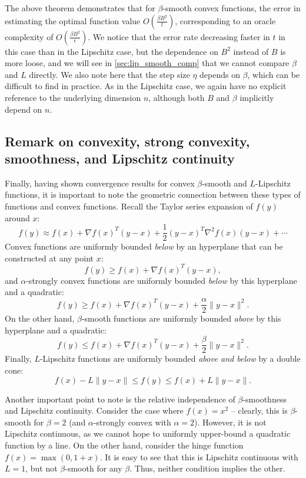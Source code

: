 The above theorem demonstrates that for $\beta$-smooth convex functions, the error in estimating the optimal function value $O\left(\frac{\beta B^2}{t}\right)$, corresponding to an oracle complexity of $O\left(\frac{\beta B^2}{\epsilon}\right)$. We notice that the error rate decreasing faster in $t$ in this case than in the Lipschitz case, but the dependence on $B^2$ instead of $B$ is more loose, and we will see in \autoref{sec:lip_smooth_comp} that we cannot compare $\beta$ and $L$ directly. We also note here that the step size $\eta$ depends on $\beta$, which can be difficult to find in practice. As in the Lipschitz case, we again have no explicit reference to the underlying dimension $n$, although both $B$ and $\beta$ implicitly depend on $n$.

\subsection{Remark on convexity, strong convexity, smoothness, and Lipschitz continuity} \label{sec:lip_smooth_comp}
Finally, having shown convergence results for convex $\beta$-smooth and $L$-Lipschitz functions, it is important to note the geometric connection between these types of functions and convex functions. Recall the Taylor series expansion of $f(y)$ around $x$:
\[
f(y) \approx f(x) + \nabla f(x)^T (y - x) + \frac{1}{2} (y - x)^T \nabla^2 f(x) (y - x) + \cdots
\]
Convex functions are uniformly bounded \emph{below} by an hyperplane that can be constructed at any point $x$:
\[
f(y) \geq f(x) + \nabla f(x)^T (y - x),
\]
and $\alpha$-strongly convex functions are uniformly bounded \emph{below} by this hyperplane and a quadratic:
\[
f(y) \geq f(x) + \nabla f(x)^T (y - x) + \frac{\alpha}{2} \| y - x \|^2.
\]
On the other hand, $\beta$-smooth functions are uniformly bounded \emph{above} by this hyperplane and a quadratic:
\[
f(y) \leq f(x) + \nabla f(x)^T (y - x) + \frac{\beta}{2} \| y - x \|^2.
\]
Finally, $L$-Lipschitz functions are uniformly bounded \emph{above and below} by a double cone:
\[
f(x) - L \| y - x \| \le f(y) \leq f(x) + L \| y - x \|.
\]

Another important point to note is the relative independence of $\beta$-smoothness and Lipschitz continuity. Consider the case where $f(x) = x^2$ -- clearly, this is $\beta$-smooth for $\beta = 2$ (and $\alpha$-strongly convex with $\alpha=2$). However, it is not Lipschitz continuous, as we cannot hope to uniformly upper-bound a quadratic function by a line. On the other hand, consider the hinge function $f(x) = \max(0, 1 + x)$. It is easy to see that this is Lipschitz continuous with $L = 1$, but not $\beta$-smooth for any $\beta$. Thus, neither condition implies the other.


